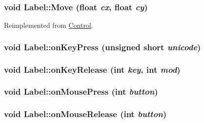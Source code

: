 \hypertarget{class_label_7be1625ce797ee05dcf6c7553ba0705f}{
\subsubsection[{Move}]{\setlength{\rightskip}{0pt plus 5cm}void Label::Move (float {\em cx}, \/  float {\em cy})}}
\label{class_label_7be1625ce797ee05dcf6c7553ba0705f}




Reimplemented from \hyperlink{class_control_8ba2e26364554895c0581a6d3e569649}{Control}.\hypertarget{class_label_8d87b0d4112a3036ea815bb289738a45}{
\subsubsection[{onKeyPress}]{\setlength{\rightskip}{0pt plus 5cm}void Label::onKeyPress (unsigned short {\em unicode})}}
\label{class_label_8d87b0d4112a3036ea815bb289738a45}


\hypertarget{class_label_8bf84bdf751eaeb42d226ba021b63413}{
\subsubsection[{onKeyRelease}]{\setlength{\rightskip}{0pt plus 5cm}void Label::onKeyRelease (int {\em key}, \/  int {\em mod})}}
\label{class_label_8bf84bdf751eaeb42d226ba021b63413}


\hypertarget{class_label_83f0487c73dad47556758882f00acc3f}{
\subsubsection[{onMousePress}]{\setlength{\rightskip}{0pt plus 5cm}void Label::onMousePress (int {\em button})}}
\label{class_label_83f0487c73dad47556758882f00acc3f}


\hypertarget{class_label_e603188d29229b2cc2a6bfe9f5117856}{
\subsubsection[{onMouseRelease}]{\setlength{\rightskip}{0pt plus 5cm}void Label::onMouseRelease (int {\em button})}}
\label{class_label_e603188d29229b2cc2a6bfe9f5117856}


